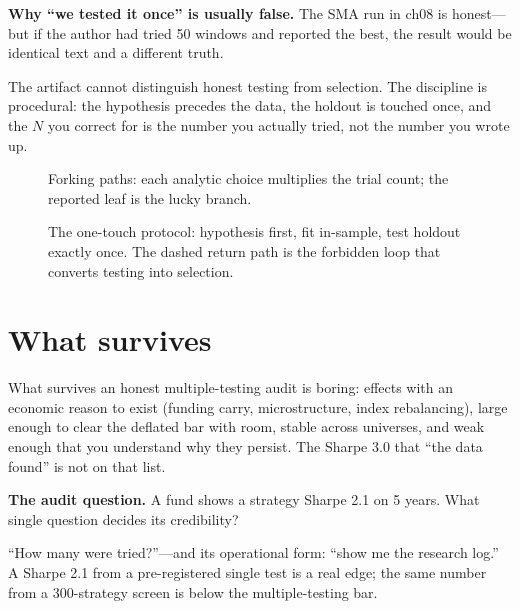\begin{example}\label{ex:forking}
\textbf{Why ``we tested it once'' is usually false.} The SMA run in ch08 is honest---but
if the author had tried 50 windows and reported the best, the result would be identical
text and a different truth.
\begin{solution}
The artifact cannot distinguish honest testing from selection. The discipline is
procedural: the hypothesis precedes the data, the holdout is touched once, and the $N$
you correct for is the number you actually tried, not the number you wrote up.
\end{solution}
\end{example}

\begin{figure}[htbp]\centering

\caption{Forking paths: each analytic choice multiplies the trial count; the reported
leaf is the lucky branch.}
\label{fig:forking}
\end{figure}

\begin{figure}[htbp]\centering

\caption{The one-touch protocol: hypothesis first, fit in-sample, test holdout exactly
once. The dashed return path is the forbidden loop that converts testing into selection.}
\label{fig:protocol}
\end{figure}

\section{What survives}\label{sec:survive}

What survives an honest multiple-testing audit is boring: effects with an economic reason
to exist (funding carry, microstructure, index rebalancing), large enough to clear the
deflated bar with room, stable across universes, and weak enough that you understand why
they persist. The Sharpe 3.0 that ``the data found'' is not on that list.

\begin{example}\label{ex:audit}
\textbf{The audit question.} A fund shows a strategy Sharpe 2.1 on 5 years. What single
question decides its credibility?
\begin{solution}
``How many were tried?''---and its operational form: ``show me the research log.'' A
Sharpe 2.1 from a pre-registered single test is a real edge; the same number from a
300-strategy screen is below the multiple-testing bar.
\end{solution}
\end{example}

